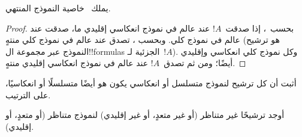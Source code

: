 \documentclass[../../../include/open-logic-section]{subfiles}
\begin{document}
\begin{cor}
  يملك~ خاصية النموذج المنتهي.
\end{cor}

\begin{proof}
  بحسب~، إذا صدقت~$!A$ عند عالم في نموذج
  انعكاسي إقليدي ما، صدقت عند عالم في نموذج كلي. وبحسب
  ، تصدق عند عالم في نموذج كلي منتهٍ (هو ترشيح
  النموذج عبر مجموعة ال!!{formula}s الجزئية لـ~$!A$). وكل نموذج كلي
  انعكاسي وإقليدي أيضًا؛ ومن ثم تصدق~$!A$ عند عالم في نموذج انعكاسي
  إقليدي منتهٍ.
\end{proof}

\begin{prob}
  أثبت أن كل ترشيح لنموذج متسلسل أو انعكاسي يكون هو أيضًا متسلسلًا أو
  انعكاسيًا، على الترتيب.
\end{prob}

\begin{prob}
  أوجد ترشيحًا غير متناظر (أو غير متعدٍ، أو غير إقليدي) لنموذج متناظر
  (أو متعدٍ، أو إقليدي).
\end{prob}
\end{document}
